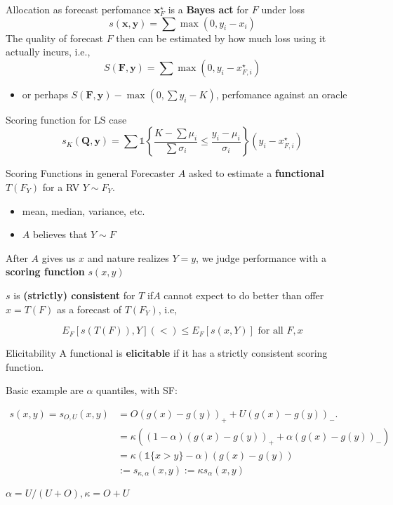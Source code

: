 \documentclass[
  ignorenonframetext,
]{beamer}
\providecommand{\tightlist}{%
  \setlength{\itemsep}{0pt}\setlength{\parskip}{0pt}}\usepackage{longtable,booktabs,array}
\begin{document}
\begin{frame}{Allocation as forecast perfomance}
\protect\hypertarget{allocation-as-forecast-perfomance}{}
\(\mathbf{x}_F^{\star}\) is a \textbf{Bayes act} for \(F\) under loss \[
s(\mathbf{x}, \mathbf{y}) = \sum \max(0,y_i - x_i)
\] The quality of forecast \(F\) then can be estimated by how much loss
using it actually incurs, i.e., \[
S(\mathbf{F}, \mathbf{y}) = \sum \max(0,y_i - x_{F,i}^{\star})
\]

\begin{itemize}
\tightlist
\item
  or perhaps \(S(\mathbf{F}, \mathbf{y}) - \max(0, \sum y_i-K)\),
  perfomance against an oracle
\end{itemize}
\end{frame}

\begin{frame}{Scoring function for LS case}
\protect\hypertarget{scoring-function-for-ls-case}{}
\[
s_K(\mathbf{Q}, \mathbf{y})=\sum \mathbb{1}\left\{\frac{K-\sum \mu_i}{\sum \sigma_i} \leq \frac{y_i-\mu_i}{\sigma_i}\right\}\left(y_i-x_{F,i}^{\star}\right)
\]
\end{frame}

\begin{frame}{Scoring Functions in general}
\protect\hypertarget{scoring-functions-in-general}{}
Forecaster \(A\) asked to estimate a \textbf{functional} \(T(F_Y)\) for
a RV \(Y\sim F_Y\).

\begin{itemize}
\tightlist
\item
  mean, median, variance, etc.
\item
  \(A\) believes that \(Y \sim F\)
\end{itemize}

After \(A\) gives us \(x\) and nature realizes \(Y=y\), we judge
performance with a \textbf{scoring function} \(s(x,y)\)

\(s\) is \textbf{(strictly) consistent} for \(T\) if\(A\) cannot expect
to do better than offer \(x=T(F)\) as a forecast of \(T(F_Y)\), i.e,

\[
E_F[s(T(F)),Y] (<) \leq E_F[s(x,Y)] \text{ for all } F,x
\]
\end{frame}

\begin{frame}{Elicitability}
\protect\hypertarget{elicitability}{}
A functional is \textbf{elicitable} if it has a strictly consistent
scoring function.

Basic example are \(\alpha\) quantiles, with SF:

\[
\begin{aligned}
s(x, y)=s_{O, U}(x, y) &=O(g(x)-g(y))_{+}+U(g(x)-g(y))_{-} . \\
&=\kappa\left((1-\alpha)(g(x)-g(y))_{+}+\alpha(g(x)-g(y))_{-}\right) \\
&=\kappa(\mathbb{1}\{x>y\}-\alpha)(g(x)-g(y)) \\
&:=s_{\kappa, \alpha}(x, y):=\kappa s_\alpha(x, y)
\end{aligned}
\]

\(\alpha=U /(U+O), \kappa = O+U\)
\end{frame}
\end{document}
